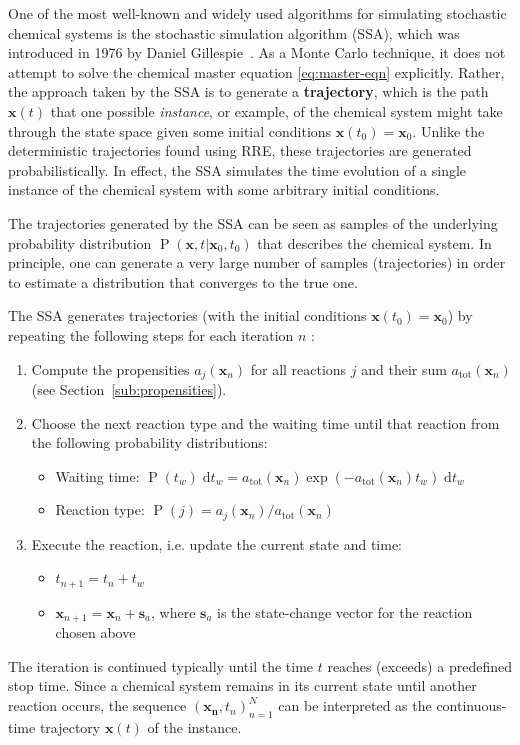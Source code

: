 \documentclass[english,letterpaper,12pt]{article}
\newcommand{\defkeywd}[1]{\textbf{#1}}
\newcommand{\dee}{\;\mathrm{d}}
\renewcommand{\vec}[1]{\ensuremath{\mathbf{#1}}}
\DeclareMathOperator{\Prob}{P}
\begin{document}
\begin{doublespacing}
One of the most well-known and widely used  algorithms for simulating stochastic chemical systems is the stochastic simulation algorithm (SSA), which was introduced in 1976 by Daniel Gillespie~\cite{gillespie-1976}. As a Monte Carlo technique, it does not attempt to solve the chemical master equation \eqref{eq:master-eqn} explicitly. Rather, the approach taken by the SSA is to generate a \defkeywd{trajectory}, which is the path $\vec{x}(t)$ that one possible \emph{instance}, or example, of the chemical system might take through the state space given some initial conditions $\vec{x}(t_0) = \vec{x}_0$. Unlike the deterministic trajectories found using RRE, these trajectories are generated probabilistically. In effect, the SSA simulates the time evolution of a single instance of the chemical system with some arbitrary initial conditions.

The trajectories generated by the SSA can be seen as samples of the underlying probability distribution $\Prob(\vec{x}, t | \vec{x}_0, t_0)$ that describes the chemical system. In principle, one can generate a very large number of samples (trajectories) in order to estimate a distribution that converges to the true one.

The SSA generates trajectories (with the initial conditions $\vec{x}(t_0) = \vec{x}_0$) by repeating the following steps for each iteration $n$ \cite{gillespie-ssa}:
\begin{enumerate}
    \item Compute the propensities $a_j(\vec{x}_n)$ for all reactions $j$ and their sum $a_\text{tot}(\vec{x}_n)$ (see Section~\ref{sub:propensities}).
    \item Choose the next reaction type and the waiting time until that reaction from the following probability distributions:
    \begin{itemize}
        \item Waiting time: $\Prob(t_w)\dee t_w = a_\text{tot}(\vec{x}_n) \exp(-a_\text{tot}(\vec{x}_n) t_w) \dee t_w$
        \item Reaction type: $\Prob(j) = a_j(\vec{x}_n) / a_\text{tot}(\vec{x}_n)$
    \end{itemize}
    \item Execute the reaction, i.e. update the current state and time:
    \begin{itemize}
        \item $t_{n+1} = t_n + t_w$
        \item $\vec{x}_{n+1} = \vec{x}_n + \vec{s}_a$, where $\vec{s}_a$ is the state-change vector for the reaction chosen above
    \end{itemize}
\end{enumerate}
The iteration is continued typically until the time $t$ reaches (exceeds) a predefined stop time. Since a chemical system remains in its current state until another reaction occurs, the sequence $\left(\vec{x_n}, t_n\right)_{n=1}^N$ can be interpreted as the continuous-time trajectory $\vec{x}(t)$ of the instance.


\end{doublespacing}
\end{document}
